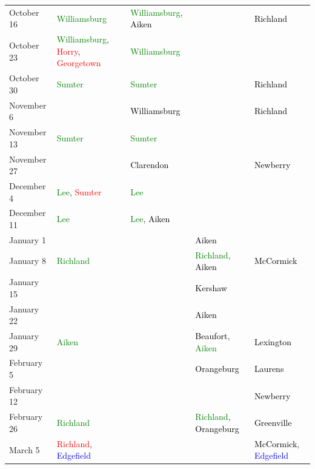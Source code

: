 \documentclass[11pt]{article}
\theoremstyle{ModifiedStyle}
\begin{document}
\begin{table}[H]
{\begin{tabular}{L{23mm}C{55mm}C{38mm}C{38mm}C{38mm}}
    			\rule{0pt}{2.3ex} October 16 &  \textcolor{green}{Williamsburg} & \textcolor{green}{Williamsburg}, \textcolor{black}{Aiken} & &  \textcolor{black}{Richland}\\
    			\rule{0pt}{2.3ex} October 23 &  \textcolor{green}{Williamsburg}, \textcolor{red}{Horry}, \textcolor{red}{Georgetown} & \textcolor{green}{Williamsburg} & &\\
    			\rule{0pt}{2.3ex} October 30 &  \textcolor{green}{Sumter} & \textcolor{green}{Sumter} & &  \textcolor{black}{Richland}\\
    			\rule{0pt}{2.3ex} November 6 & & \textcolor{black}{Williamsburg} & &  \textcolor{black}{Richland}\\\rule{0pt}{2.3ex} November 13 &  \textcolor{green}{Sumter} & \textcolor{green}{Sumter} & &\\
    			\rule{0pt}{2.3ex} November 27 & & \textcolor{black}{Clarendon} & &  \textcolor{black}{Newberry}\\
    			\rule{0pt}{2.3ex} December 4 &  \textcolor{green}{Lee}, \textcolor{red}{Sumter} & \textcolor{green}{Lee} & &\\
    			\rule{0pt}{2.3ex} December 11 &  \textcolor{green}{Lee} & \textcolor{green}{Lee}, \textcolor{black}{Aiken} & &\\
    			\rule{0pt}{2.3ex} January 1 & & & \textcolor{black}{Aiken} &\\
    			\rule{0pt}{2.3ex} January 8 &  \textcolor{green}{Richland} & & \textcolor{green}{Richland}, \textcolor{black}{Aiken} &  \textcolor{black}{McCormick}\\
    			\rule{0pt}{2.3ex} January 15 & & & \textcolor{black}{Kershaw} &\\
    			\rule{0pt}{2.3ex} January 22 & & & \textcolor{black}{Aiken} &\\
    			\rule{0pt}{2.3ex} January 29 &  \textcolor{green}{Aiken} & & \textcolor{black}{Beaufort}, \textcolor{green}{Aiken} &  \textcolor{black}{Lexington}\\
    			\rule{0pt}{2.3ex} February 5 & & & \textcolor{black}{Orangeburg} &  \textcolor{black}{Laurens}\\
    			\rule{0pt}{2.3ex} February 12 & & & &  \textcolor{black}{Newberry}\\
    			\rule{0pt}{2.3ex} February 26 &  \textcolor{green}{Richland} & & \textcolor{green}{Richland}, \textcolor{black}{Orangeburg} &  \textcolor{black}{Greenville}\\
    			\rule{0pt}{2.3ex} March 5 &  \textcolor{red}{Richland}, \textcolor{blue}{Edgefield} & & &  \textcolor{black}{McCormick}, \textcolor{blue}{Edgefield}\\

\end{tabular}}
\end{table}
\end{document}
